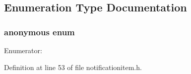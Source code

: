 \subsection{\-Enumeration \-Type \-Documentation}
\hypertarget{group___notify_plugin_gae19b5277b68bb273f1a0225e41255cce}{\subsubsection[{anonymous enum}]{\setlength{\rightskip}{0pt plus 5cm}anonymous enum}}\label{group___notify_plugin_gae19b5277b68bb273f1a0225e41255cce}
\begin{Desc}
\item[\-Enumerator\-: ]\par
\begin{description}
\item[{\em 
\hypertarget{group___notify_plugin_ggae19b5277b68bb273f1a0225e41255ccea8fee5829d0108684543cf01a53af668f}{e\-Default\-Timeout}\label{group___notify_plugin_ggae19b5277b68bb273f1a0225e41255ccea8fee5829d0108684543cf01a53af668f}
}]\end{description}
\end{Desc}



\-Definition at line 53 of file notificationitem.\-h.

